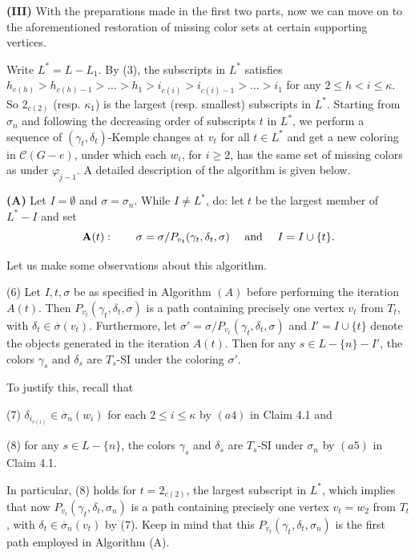 \documentclass[11pt]{article}
\newcommand{\CC}{\mathcal{C}}
\newcommand{\phiv}{\varphi}
\begin{document}
\vskip 2mm

{\bf (III)} With the preparations made in the first two parts, now we can move on to the aforementioned restoration of missing color sets at
certain supporting vertices. 

Write $L^* = L-L_1$.  By (3), the subscripts in $L^*$ satisfies $h_{c(h)} > h_{c(h)-1}> \ldots > h_1 > i_{c(i)} > i_{c(i)-1} > \ldots > i_1$ 
for any $2\le h<i \le \kappa$. So $2_{c(2)}$ (resp. $\kappa_1$) is the largest (resp. smallest) subscripts in $L^*$. Starting from $\sigma_n$
and following the decreasing order of subscripts $t$ in $L^*$, we perform a sequence of $(\gamma_t, \delta_t)$-Kemple changes at $v_t$ for 
all $t\in L^*$ and get a new coloring in $\CC(G-e)$, under which each $w_i$, for $i \ge 2$, has the same set of missing colors as under 
$\phiv_{j-1}$. A detailed description of the algorithm is given below.

\vskip 1mm

{\flushleft \bf (A)} \hskip 1mm Let $I=\emptyset$ and $\sigma= \sigma_n$. While $I \ne L^*$, do: let $t$ be the largest member of $L^* -I$ and set 
\[
{\bf A}(t) : \qquad  \sigma = \sigma/P_{v_t}(\gamma_t, \delta_t, \sigma) \quad \mbox{ and }\quad  I = I\cup\{t\}. 
\]

Let us make some observations about this algorithm.

\vskip 1mm
(6) Let $I, t, \sigma$ be as specified in Algorithm $(A)$ before performing the iteration $A(t)$. Then 
$P_{v_t}(\gamma_t, \delta_t, \sigma)$ is a path containing precisely one vertex $v_t$ from $T_t$,
with $\delta_t \in \overline{\sigma}(v_t)$. Furthermore, let $\sigma'= \sigma / P_{v_t} (\gamma_t, \delta_t, \sigma)$
and $I'= I\cup \{t\}$ denote the objects generated in the iteration $A(t)$. Then for any $s\in L-\{n\}-I'$, 
the colors $\gamma_s$ and $\delta_s$ are $T_s$-SI under the coloring $\sigma'$. 

To justify this, recall that 

(7) $\delta_{i_{c(i)}}\in\overline{\sigma}_n(w_i)$ for each $2\leq i\leq \kappa$ by $(a4)$ in Claim 4.1 and 

(8) for any $s\in L-\{n\}$, the colors $\gamma_s$ and $\delta_s$ are $T_s$-SI under $\sigma_n$ by $(a5)$ in Claim 4.1. 

\noindent In particular, (8) holds for $t=2_{c(2)}$, the largest subscript in $L^*$, which implies that now
$P_{v_t}(\gamma_t, \delta_t, \sigma_n)$ is a path containing precisely one vertex $v_t=w_2$ from $T_t$, 
with $\delta_t \in \overline{\sigma}_n(v_t)$ by (7). Keep in mind that this $P_{v_t}(\gamma_t, \delta_t, \sigma_n)$
is the first path employed in Algorithm (A).
\end{document}

